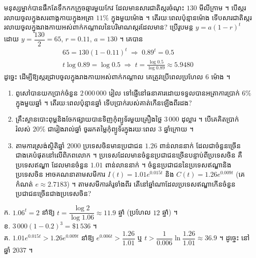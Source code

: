 \begin{example}[លំហាត់គំរូ]
មនុស្សម្នាក់បានផឹកតែទឹកកកក្រូចឆ្មារមួយកែវ ដែលមានសារជាតិស្ករចំណុះ $130$ មីលីក្រាម ។ បើស្កររលាយចូលក្នុងសរពាង្គកាយក្នុងអត្រា $11\%$ ក្នុងមួយម៉ោង ។ តើរយៈពេលប៉ុន្មានម៉ោង ទើបសារជាតិស្កររលាយចូលក្នុងរាងកាយអស់ពាក់កណ្ដាលនៃបរិមាណស្ករដែលមាន?
\ans
ប្រើរូបមន្ត $y = a(1 - r)^t$ ដោយ $y = \dfrac{130}{2} = 65$, $r = 0.11$, $a = 130$ ។ គេបាន
\[
\begin{gathered}
65 = 130(1 - 0.11)^t \;\Rightarrow\; 0.89^t = 0.5\\
t\log 0.89 = \log 0.5 \;\Rightarrow\; t = \frac{\log 0.5}{\log 0.89} \approx 5.9480
\end{gathered}
\]
ដូច្នេះ ដើម្បីឱ្យស្ករជ្រាបចូលក្នុងរាងកាយអស់ពាក់កណ្ដាល គេត្រូវប្រើពេលប្រហែល $6$ ម៉ោង ។
\end{example}

\begin{pro}
\begin{enumerate}[a]
  \item ពូសៅបានយកប្រាក់ចំនួន $2\,000\,000$ រៀល ទៅផ្ញើនៅធនាគារដោយទទួលបានអត្រាការប្រាក់ $6\%$ ក្នុងមួយឆ្នាំ ។ តើរយៈពេលប៉ុន្មានឆ្នាំ ទើបប្រាក់របស់គាត់កើនឡើងពីរដង?
  \item គ្រឹះស្ថានបោះពុម្ពនិងចែកផ្សាយបានទិញកុំព្យូទ័រមួយគ្រឿងថ្លៃ $3\,000$ ដុល្លារ ។ បើគេគិតប្រាក់រំលស់ $20\%$ ជារៀងរាល់ឆ្នាំ ចូររកតម្លៃកុំព្យូទ័រក្នុងរយៈពេល $3$ ឆ្នាំក្រោយ ។
  \item តាមការស្រង់ស្ថិតិឆ្នាំ $2000$ ប្រទេសចិនមានប្រជាជន $1.26$ ពាន់លាននាក់ ដែលជាចំនួនច្រើនជាងគេបំផុតនៅលើពិភពលោក ។ ប្រទេសដែលមានចំនួនប្រជាជនច្រើនបន្ទាប់ពីប្រទេសចិន គឺប្រទេសឥណ្ឌា ដែលមានចំនួន $1.01$ ពាន់លាននាក់ ។ ចំនួនប្រជាជននៃប្រទេសឥណ្ឌានិងប្រទេសចិន អាចគណនាតាមសមីការ $I(t) = 1.01e^{0.015t}$ និង $C(t) = 1.26e^{0.009t}$ (គេកំណត់ $e \approx 2.7183$) ។ តាមសមីការគំរូទាំងពីរ តើនៅឆ្នាំណាដែលប្រទេសឥណ្ឌាកើនចំនួនប្រជាជនច្រើនជាងប្រទេសចិន?
\end{enumerate}
\ans
ក. $1.06^t = 2$ នាំឱ្យ $t = \dfrac{\log 2}{\log 1.06} \approx 11.9$ ឆ្នាំ (ប្រហែល $12$ ឆ្នាំ) ។\\
ខ. $3\,000(1 - 0.2)^3 = \$1\,536$ ។\\
គ. $1.01e^{0.015t} > 1.26e^{0.009t}$ នាំឱ្យ $e^{0.006t} > \dfrac{1.26}{1.01}$ ឬ $t > \dfrac{1}{0.006}\ln\dfrac{1.26}{1.01} \approx 36.9$ ។ ដូច្នេះ នៅឆ្នាំ $2037$ ។
\end{pro}

